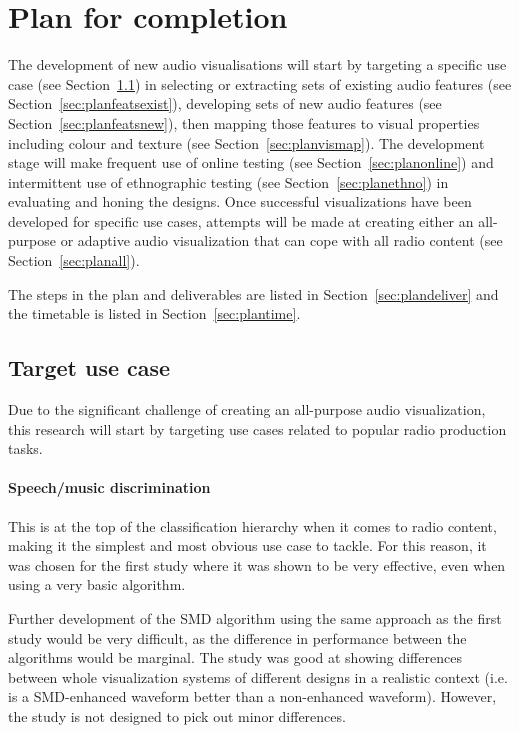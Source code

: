 \section{Plan for completion}\label{sec:plan}
The development of new audio visualisations will start by targeting a specific
use case (see Section~\ref{sec:planusecase}) in selecting or extracting sets of
existing audio features (see Section~\ref{sec:planfeatsexist}), developing sets
of new audio features (see Section~\ref{sec:planfeatsnew}), then mapping those
features to visual properties including colour and texture (see
Section~\ref{sec:planvismap}). The development stage will make frequent use of
online testing (see Section~\ref{sec:planonline}) and intermittent use of
ethnographic testing (see Section~\ref{sec:planethno}) in evaluating and honing
the designs. Once successful visualizations have been developed for specific
use cases, attempts will be made at creating either an all-purpose or adaptive
audio visualization that can cope with all radio content (see
Section~\ref{sec:planall}).

The steps in the plan and deliverables are listed in
Section~\ref{sec:plandeliver} and the timetable is listed in
Section~\ref{sec:plantime}.

\subsection{Target use case}\label{sec:planusecase}
Due to the significant challenge of creating an all-purpose audio
visualization, this research will start by targeting use cases related to
popular radio production tasks.

\paragraph{Speech/music discrimination}
This is at the top of the classification hierarchy when it comes to radio
content, making it the simplest and most obvious use case to tackle. For this
reason, it was chosen for the first study where it was shown to be very
effective, even when using a very basic algorithm.

Further development of the SMD algorithm using the same approach as the first
study would be very difficult, as the difference in performance between the
algorithms would be marginal. The study was good at showing differences between
whole visualization systems of different designs in a realistic context (i.e.
is a SMD-enhanced waveform better than a non-enhanced waveform). However, the
study is not designed to pick out minor differences.

